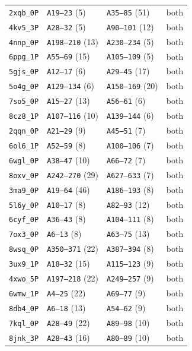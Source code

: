 \begin{longtable}{llll}
\texttt{2xqb\_0P} & \texttt{A19--23} (5) & \texttt{A35--85} (51) & both \\
\texttt{4kv5\_3P} & \texttt{A28--32} (5) & \texttt{A90--101} (12) & both \\
\texttt{4nnp\_0P} & \texttt{A198--210} (13) & \texttt{A230--234} (5) & both \\
\texttt{6ppg\_1P} & \texttt{A55--69} (15) & \texttt{A105--109} (5) & both \\
\texttt{5gjs\_0P} & \texttt{A12--17} (6) & \texttt{A29--45} (17) & both \\
\texttt{5o4g\_0P} & \texttt{A129--134} (6) & \texttt{A150--169} (20) & both \\
\texttt{7so5\_0P} & \texttt{A15--27} (13) & \texttt{A56--61} (6) & both \\
\texttt{8cz8\_1P} & \texttt{A107--116} (10) & \texttt{A139--144} (6) & both \\
\texttt{2qqn\_0P} & \texttt{A21--29} (9) & \texttt{A45--51} (7) & both \\
\texttt{6ol6\_1P} & \texttt{A52--59} (8) & \texttt{A100--106} (7) & both \\
\texttt{6wgl\_0P} & \texttt{A38--47} (10) & \texttt{A66--72} (7) & both \\
\texttt{8oxv\_0P} & \texttt{A242--270} (29) & \texttt{A627--633} (7) & both \\
\texttt{3ma9\_0P} & \texttt{A19--64} (46) & \texttt{A186--193} (8) & both \\
\texttt{5l6y\_0P} & \texttt{A10--17} (8) & \texttt{A82--93} (12) & both \\
\texttt{6cyf\_0P} & \texttt{A36--43} (8) & \texttt{A104--111} (8) & both \\
\texttt{7ox3\_0P} & \texttt{A6--13} (8) & \texttt{A63--75} (13) & both \\
\texttt{8wsq\_0P} & \texttt{A350--371} (22) & \texttt{A387--394} (8) & both \\
\texttt{3ux9\_1P} & \texttt{A18--32} (15) & \texttt{A115--123} (9) & both \\
\texttt{4xwo\_5P} & \texttt{A197--218} (22) & \texttt{A249--257} (9) & both \\
\texttt{6wmw\_1P} & \texttt{A4--25} (22) & \texttt{A69--77} (9) & both \\
\texttt{8db4\_0P} & \texttt{A6--18} (13) & \texttt{A54--62} (9) & both \\
\texttt{7kql\_0P} & \texttt{A28--49} (22) & \texttt{A89--98} (10) & both \\
\texttt{8jnk\_3P} & \texttt{A28--43} (16) & \texttt{A80--89} (10) & both \\

\end{longtable}

